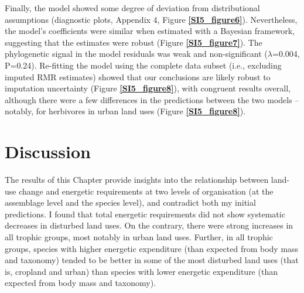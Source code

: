Finally, the model showed some degree of deviation from distributional assumptions (diagnostic plots, Appendix 4, Figure \textbf{\ref{SI5_figure6}}). Nevertheless, the model's coefficients were similar when estimated with a Bayesian framework, suggesting that the estimates were robust (Figure \textbf{\ref{SI5_figure7}}). The phylogenetic signal in the model residuals was weak and non-significant ($\lambda$=0.004, P=0.24). Re-fitting the model using the complete data subset (i.e., excluding imputed RMR estimates) showed that our conclusions are likely robust to imputation uncertainty (Figure \textbf{\ref{SI5_figure8}}), with congruent results overall, although there were a few differences in the predictions between the two models – notably, for herbivores in urban land uses (Figure \textbf{\ref{SI5_figure8}}).  



\clearpage
\section{Discussion}

The results of this Chapter provide insights into the relationship between land-use change and energetic requirements at two levels of organisation (at the assemblage level and the species level), and contradict both my initial predictions. I found that total energetic requirements did not show systematic decreases in disturbed land uses. On the contrary, there were strong increases in all trophic groups, most notably in urban land uses. Further, in all trophic groups, species with higher energetic expenditure (than expected from body mass and taxonomy) tended to be better in some of the most disturbed land uses (that is, cropland and urban) than species with lower energetic expenditure (than expected from body mass and taxonomy).

